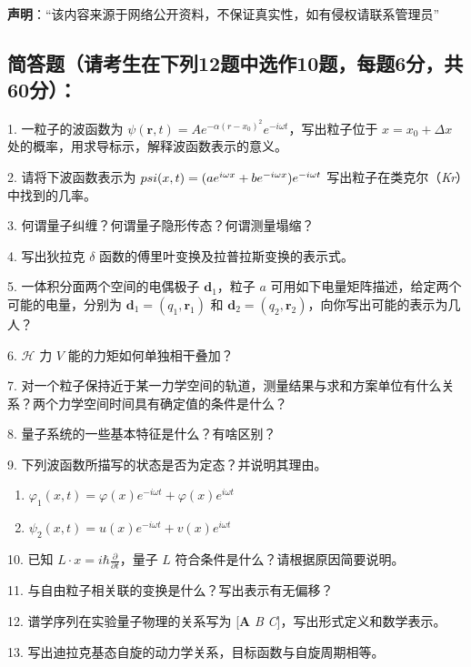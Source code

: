 
\textbf{声明}：“该内容来源于网络公开资料，不保证真实性，如有侵权请联系管理员”

\subsection{简答题（请考生在下列12题中选作10题，每题6分，共60分）：}

1. 一粒子的波函数为 $\psi (\mathbf{r}, t) = A e^{-\alpha(r - x_0)^2} e^{-i \omega t}$，写出粒子位于 $x = x_0 + \Delta x$ 处的概率，用求导标示，解释波函数表示的意义。

2. 请将下波函数表示为 $\\psi (x, t) = (a e^{i \omega x} + b e^{-i \omega x}) e^{-i \omega t}$ 写出粒子在类克尔（\textit{Kr}）中找到的几率。

3. 何谓量子纠缠？何谓量子隐形传态？何谓测量塌缩？

4. 写出狄拉克 $\delta$ 函数的傅里叶变换及拉普拉斯变换的表示式。

5. 一体积分面两个空间的电偶极子 $ \mathbf{d}_1$，粒子 $a$ 可用如下电量矩阵描述，给定两个可能的电量，分别为 $\mathbf{d}_1 = (q_1, \mathbf{r}_1)$ 和 $\mathbf{d}_2 = (q_2, \mathbf{r}_2)$，向你写出可能的表示为几人？

6. $\mathcal{H}$ 力 $V$ 能的力矩如何单独相干叠加？

7. 对一个粒子保持近于某一力学空间的轨道，测量结果与求和方案单位有什么关系？两个力学空间时间具有确定值的条件是什么？

8. 量子系统的一些基本特征是什么？有啥区别？

9. 下列波函数所描写的状态是否为定态？并说明其理由。

\begin{enumerate}
  \item $\varphi_1 (x, t) = \varphi (x) e^{-i \omega t} + \varphi (x) e^{i \omega t}$
  \item $\psi_2 (x, t) = u (x) e^{-i \omega t} + v (x) e^{i \omega t}$
\end{enumerate}

10. 已知 $L \cdot x = i \hbar \frac{\partial}{\partial t}$，量子 $L$ 符合条件是什么？请根据原因简要说明。

11. 与自由粒子相关联的变换是什么？写出表示有无偏移？

12. 谱学序列在实验量子物理的关系写为 [\textbf{A} \textit{B} \textit{C}]，写出形式定义和数学表示。

13. 写出迪拉克基态自旋的动力学关系，目标函数与自旋周期相等。
